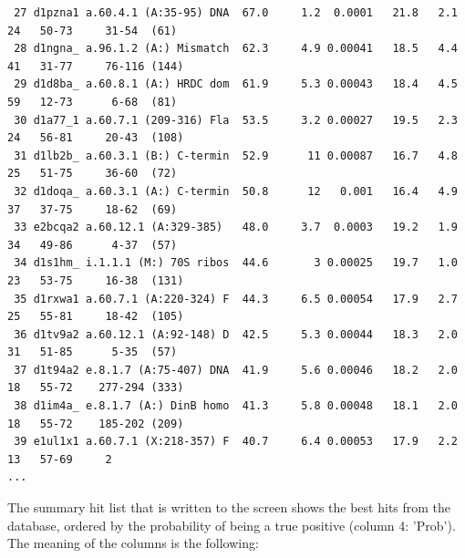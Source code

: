 \documentclass[11pt,a4paper]{article}
\begin{document}
\begin{verbatim}
 27 d1pzna1 a.60.4.1 (A:35-95) DNA  67.0     1.2  0.0001   21.8   2.1   24   50-73     31-54  (61)
 28 d1ngna_ a.96.1.2 (A:) Mismatch  62.3     4.9 0.00041   18.5   4.4   41   31-77     76-116 (144)
 29 d1d8ba_ a.60.8.1 (A:) HRDC dom  61.9     5.3 0.00043   18.4   4.5   59   12-73      6-68  (81)
 30 d1a77_1 a.60.7.1 (209-316) Fla  53.5     3.2 0.00027   19.5   2.3   24   56-81     20-43  (108)
 31 d1lb2b_ a.60.3.1 (B:) C-termin  52.9      11 0.00087   16.7   4.8   25   51-75     36-60  (72)
 32 d1doqa_ a.60.3.1 (A:) C-termin  50.8      12   0.001   16.4   4.9   37   37-75     18-62  (69)
 33 e2bcqa2 a.60.12.1 (A:329-385)   48.0     3.7  0.0003   19.2   1.9   34   49-86      4-37  (57)
 34 d1s1hm_ i.1.1.1 (M:) 70S ribos  44.6       3 0.00025   19.7   1.0   23   53-75     16-38  (131)
 35 d1rxwa1 a.60.7.1 (A:220-324) F  44.3     6.5 0.00054   17.9   2.7   25   55-81     18-42  (105)
 36 d1tv9a2 a.60.12.1 (A:92-148) D  42.5     5.3 0.00044   18.3   2.0   31   51-85      5-35  (57)
 37 d1t94a2 e.8.1.7 (A:75-407) DNA  41.9     5.6 0.00046   18.2   2.0   18   55-72    277-294 (333)
 38 d1im4a_ e.8.1.7 (A:) DinB homo  41.3     5.8 0.00048   18.1   2.0   18   55-72    185-202 (209)
 39 e1ul1x1 a.60.7.1 (X:218-357) F  40.7     6.4 0.00053   17.9   2.2   13   57-69     2
...
\end{verbatim}\normalsize
 
The summary hit list that is written to the screen shows the best hits from the 
database, ordered by the probability of being a true positive (column 4: 'Prob'). 
The meaning of the columns is the following:
\vspace{5mm}
\end{document}
